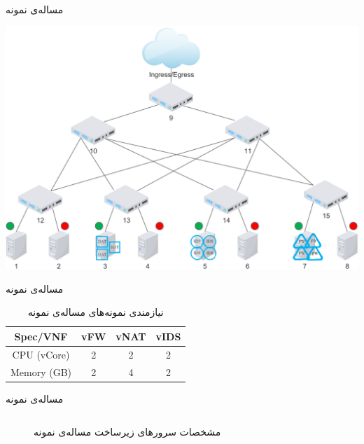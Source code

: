 \documentclass{beamer}
\begin{document}
\begin{persian}
\begin{frame}{مساله‌ی نمونه}
    \begin{center}
        \includegraphics[scale=0.4]{../diagrams/topology.pdf}
    \end{center}
\end{frame}
\begin{frame}{مساله‌ی نمونه}
    \begin{table}[h]
        \caption{نیازمندی نمونه‌های مساله‌ی نمونه}
        \vspace{0.5cm}
        \begin{center}\begin{latin}\begin{tabular}{|c|c|c|c|}
            \hline
            Spec/VNF & vFW & vNAT & vIDS \\
            \hline
            CPU (vCore) & 2 & 2 & 2 \\
            \hline
            Memory (GB) & 2 & 4 & 2 \\
            \hline
        \end{tabular}\end{latin}\end{center}
    \end{table}
\end{frame}
\begin{frame}{مساله‌ی نمونه}
    \begin{figure}[h!]
        \caption{مشخصات سرورهای زیرساخت مساله‌ی نمونه}
        \vspace{0.5cm}
        \begin{center}\begin{latin}\begin{tabular}{|c|c|c|}

\end{tabular}
\end{latin}
\end{center}
\end{figure}
\end{frame}
\end{persian}
\end{document}
